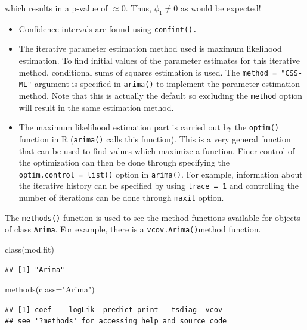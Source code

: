 \documentclass[
]{book}
\newenvironment{Shaded}{\begin{snugshade}}{\end{snugshade}}
\newcommand{\AttributeTok}[1]{\textcolor[rgb]{0.77,0.63,0.00}{#1}}
\newcommand{\FunctionTok}[1]{\textcolor[rgb]{0.00,0.00,0.00}{#1}}
\newcommand{\NormalTok}[1]{#1}
\newcommand{\StringTok}[1]{\textcolor[rgb]{0.31,0.60,0.02}{#1}}
\providecommand{\tightlist}{%
  \setlength{\itemsep}{0pt}\setlength{\parskip}{0pt}}
\theoremstyle{definition}
\theoremstyle{definition}
\theoremstyle{definition}
\theoremstyle{definition}
\theoremstyle{remark}
\begin{document}
which results in a p-value of \(\approx 0\). Thus, \(\phi_1 \ne 0\) as would be expected!

\begin{itemize}
\tightlist
\item
  Confidence intervals are found using \texttt{confint().}
\item
  The iterative parameter estimation method used is maximum likelihood estimation. To find initial values of the parameter estimates for this iterative method, conditional sums of squares estimation is used. The \texttt{method\ =\ "CSS-ML"} argument is specified in \texttt{arima()} to implement the parameter estimation method. Note that this is actually the default so excluding the \texttt{method} option will result in the same estimation method.\\
\item
  The maximum likelihood estimation part is carried out by the \texttt{optim()} function in R (\texttt{arima()} calls this function). This is a very general function that can be used to find values which maximize a function. Finer control of the optimization can then be done through specifying the \texttt{optim.control\ =\ list()} option in \texttt{arima()}. For example, information about the iterative history can be specified by using \texttt{trace\ =\ 1} and controlling the number of iterations can be done through \texttt{maxit} option.
\end{itemize}

The \texttt{methods()} function is used to see the method functions available for objects of class \texttt{Arima}. For example, there is a \texttt{vcov.Arima()}method function.

\begin{Shaded}
\begin{Highlighting}[]
\FunctionTok{class}\NormalTok{(mod.fit)}
\end{Highlighting}
\end{Shaded}

\begin{verbatim}
## [1] "Arima"
\end{verbatim}

\begin{Shaded}
\begin{Highlighting}[]
\FunctionTok{methods}\NormalTok{(}\AttributeTok{class=}\StringTok{"Arima"}\NormalTok{)}
\end{Highlighting}
\end{Shaded}

\begin{verbatim}
## [1] coef    logLik  predict print   tsdiag  vcov   
## see '?methods' for accessing help and source code
\end{verbatim}
\end{document}
